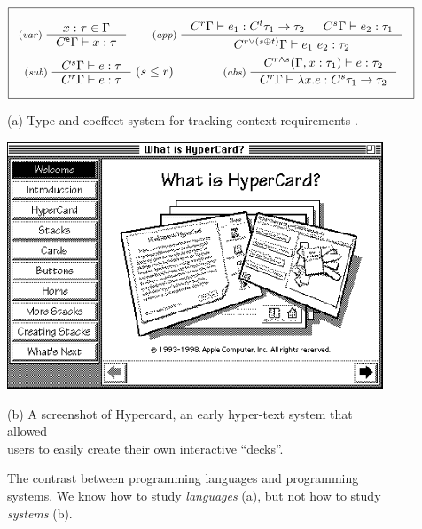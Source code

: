 \documentclass[runningheads]{llncs}
\newcommand{\ctyp}[2]{C^{#1}#2}
\newcommand{\imult}{\oplus}
\newcommand{\iunit}{\mathsf{e}}
\begin{document}
\begin{figure}[t]
\vspace{-0.5em}
\centering
\begin{equation*}
\boxed{\begin{array}{c}
\\[-0.5em]
\inference[(\emph{var})\;]
  {x : \tau \in \Gamma}
  {\ctyp{\iunit}{\Gamma} \vdash x : \tau }
%
\quad\quad
%
\inference[(\emph{app})\;]
  {\ctyp{r}{\Gamma} \vdash e_1 : \ctyp{t}{\tau_1} \rightarrow \tau_2 &
   \ctyp{s}{\Gamma} \vdash e_2 : \tau_1 }
  {\ctyp{r \vee (s \imult t)}{\Gamma} \vdash e_1~e_2 : \tau_2}
\\[1.2em]
\inference[(\emph{sub})\;]
  {\ctyp{s}{\Gamma} \vdash e : \tau }
  {\ctyp{r}{\Gamma} \vdash e : \tau }
\;(s\leq r)
%
\quad\quad\quad\quad
%
\inference[(\emph{abs})\;]
  {\ctyp{r \wedge s}{(\Gamma, x:\tau_1)} \vdash e : \tau_2}
  {\ctyp{r}{\Gamma} \vdash \lambda x.e : \ctyp{s}{\tau_1} \rightarrow \tau_2 }
\\[-0.5em]~
\end{array}}
\end{equation*}

\vspace{0.5em}
(a) Type and coeffect system for tracking context requirements \cite{petricek-2013-coeffects}.
\vspace{1.5em}

\includegraphics[scale=0.7]{figures/hyper.png}

\vspace{0.5em}
(b) A screenshot of Hypercard, an early hyper-text system that allowed \\
users to easily create their own interactive ``decks''.
\vspace{0.5em}

\caption{The contrast between programming languages and programming systems. We know how to study \emph{languages} (a), but not how to study \emph{systems} (b). }
\label{fig:langsys}
\vspace{-0.5em}
\end{figure}
\end{document}
